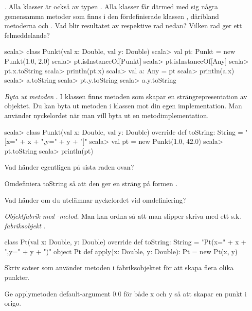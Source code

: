 \Task \emph{}. Alla klasser är också av typen . Alla klasser får därmed med sig några gemensamma metoder som finns i den fördefinierade klassen , däribland metoderna   och .  Vad blir resultatet av respektive rad nedan? Vilken rad ger ett felmeddelande?

\begin{REPL}
scala> class Punkt(val x: Double, val y: Double)
scala> val pt: Punkt = new Punkt(1.0, 2.0)
scala> pt.isInstanceOf[Punkt]
scala> pt.isInstanceOf[Any]
scala> pt.x.toString
scala> println(pt.x)
scala> val a: Any = pt
scala> println(a.x)
scala> a.toString
scala> pt.y.toString
scala> a.y.toString
\end{REPL}

\Task \emph{Byta ut metoden }. I klassen  finns metoden  som skapar en strängrepresentation av objektet. Du kan byta ut metoden  i klassen  mot din egen implementation. Man använder nyckelordet  när man vill byta ut en metodimplementation.

\begin{REPL}
scala> class Punkt(val x: Double, val y: Double) {
         override def toString: String = "[x=" + x + ",y=" + y + "]"
       }
scala> val pt = new Punkt(1.0, 42.0)
scala> pt.toString
scala> println(pt)
\end{REPL}

\Subtask Vad händer egentligen på sista raden ovan?

\Subtask Omdefiniera toString så att den ger en sträng på formen .

\Subtask Vad händer om du utelämnar nyckelordet  vid omdefiniering?

\Task \emph{Objektfabrik med -metod.} Man kan ordna så att man slipper skriva  med ett s.k. \emph{fabriksobjekt} . 
\begin{Code}
class Pt(val x: Double, y: Double) {
  override def toString: String = "Pt(x=" + x + ",y=" + y + ")"
}
object Pt { 
  def apply(x: Double, y: Double): Pt = new Pt(x, y)
}
\end{Code}

\Subtask Skriv satser som använder metoden  i fabriksobjektet  för att skapa flera olika punkter.

\Subtask Ge applymetoden default-argument 0.0 för både x och y så att  skapar en punkt i origo.

